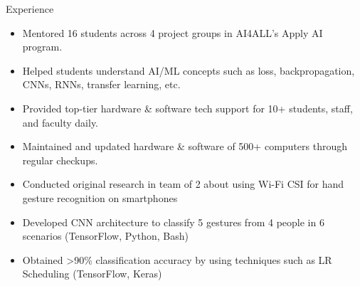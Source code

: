 \documentclass{resume} %
\begin{document}
\begin{workSection}{Experience}
    \experienceItem[
        company=AI4ALL,
        location=Remote,
        position=Student Coordinator,
        duration=August 2023 {-} Present
    ]
    \begin{itemize}
        \vspace{-0.5em}
        \itemsep -6pt {}
        \item Mentored 16 students across 4 project groups in AI4ALL's Apply AI program.
        \item Helped students understand AI/ML concepts such as loss, backpropagation, CNNs, RNNs, transfer learning, etc.
    \end{itemize}
    \experienceItem[
        company=UTEP,
        location=El Paso{,} TX,
        position=Computer Lab Assistant,
        duration=January 2023 {-} Present
    ]
    \begin{itemize}
        \vspace{-0.5em}
        \itemsep -6pt {}
        \item Provided top-tier hardware \& software tech support for 10+ students, staff, and faculty daily.
        \item Maintained and updated hardware \& software of 500+ computers through regular checkups.
    \end{itemize}
    \experienceItem[
    company=Temple University,
    location=Philadelphia{,} PA,
    position=Undergraduate Researcher,
    duration=June {-} July 2023
    ]
    \begin{itemize}
        \vspace{-0.5em}
        \itemsep -6pt {}
        \item Conducted original research in team of 2 about using Wi-Fi CSI for hand gesture recognition on smartphones
        \item Developed CNN architecture to classify 5 gestures from 4 people in 6 scenarios (TensorFlow, Python, Bash)
        \item Obtained >90\% classification accuracy by using techniques such as LR Scheduling (TensorFlow, Keras)
    \end{itemize}

\end{workSection}
\end{document}
